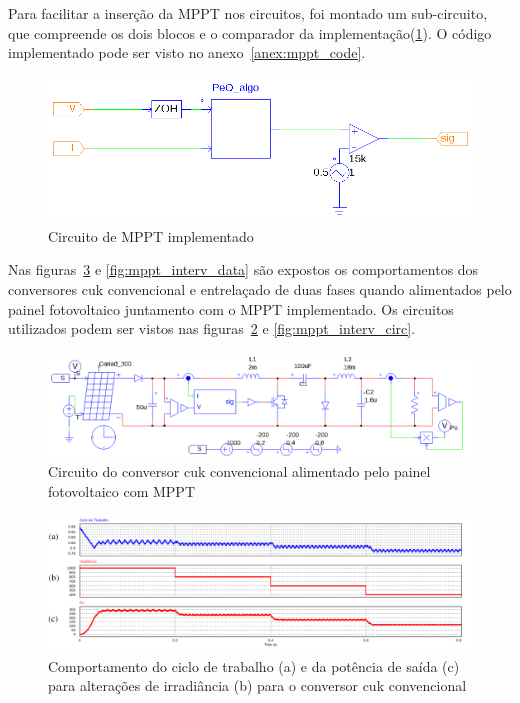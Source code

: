 \documentclass[
	12pt,				%
	openany,
	onseside,
	a4paper,			%
	english,			%
	french,				%
	spanish,			%
	brazil,				%
	]{abntex2}
\begin{document}
Para facilitar a inserção da MPPT nos circuitos, foi montado um sub-circuito, que compreende os dois blocos e o comparador da implementação(\ref{fig:mppt_subcircuit}). O código implementado pode ser visto no anexo~\ref{anex:mppt_code}.

\begin{figure}[htb]%
	\begin{center}%
		\includegraphics[width=0.85 \linewidth]{mppt_psim_circ}
		\caption{Circuito de MPPT implementado}
		\label{fig:mppt_subcircuit}
	\end{center}
\end{figure}

Nas figuras~\ref{fig:mppt_conv_data} e \ref{fig:mppt_interv_data} são expostos os comportamentos dos conversores cuk convencional e entrelaçado de duas fases quando alimentados pelo painel fotovoltaico juntamento com o MPPT implementado. Os circuitos utilizados podem ser vistos nas figuras~\ref{fig:mppt_conv_circ} e \ref{fig:mppt_interv_circ}.

\begin{figure}[htb]%
	\captionsetup{justification=centering}%
	\begin{center}%
		\includegraphics[width= \linewidth]{mppt_conv_circ}
		\caption{Circuito do conversor cuk convencional alimentado pelo painel fotovoltaico com MPPT}
		\label{fig:mppt_conv_circ}
	\end{center}
\end{figure}

\begin{figure}[htb]%
	\captionsetup{justification=centering}%
	\begin{center}%
		\includegraphics[width= \textwidth]{mppt_conv_data}
		\caption{Comportamento do ciclo de trabalho (a) e da potência de saída (c) para alterações de irradiância (b) para o conversor cuk convencional}
		\label{fig:mppt_conv_data}
	\end{center}
\end{figure}
\end{document}
